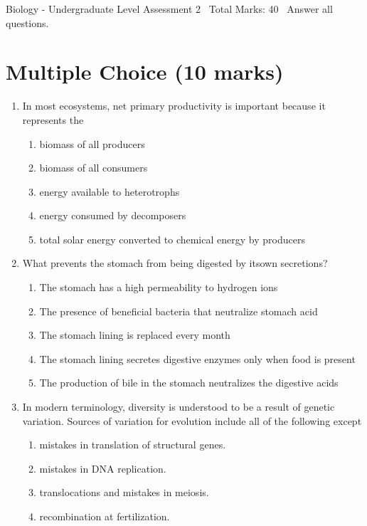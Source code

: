 \documentclass[12pt]{article}
\begin{document}
\begin{center}
Biology - Undergraduate Level Assessment 2 \
Total Marks: 40 \
Answer all questions.
\end{center}

\section*{Multiple Choice (10 marks)}
\begin{enumerate}[label=\arabic*.]
\item In most ecosystems, net primary productivity is important because it represents the
\begin{enumerate}[label=(\alph*)]
    \item biomass of all producers
    \item biomass of all consumers
    \item energy available to heterotrophs
    \item energy consumed by decomposers
    \item total solar energy converted to chemical energy by producers
\end{enumerate}
\item What prevents the stomach from being digested by itsown secretions?
\begin{enumerate}[label=(\alph*)]
    \item The stomach has a high permeability to hydrogen ions
    \item The presence of beneficial bacteria that neutralize stomach acid
    \item The stomach lining is replaced every month
    \item The stomach lining secretes digestive enzymes only when food is present
    \item The production of bile in the stomach neutralizes the digestive acids
\end{enumerate}
\item In modern terminology, diversity is understood to be a result of genetic variation. Sources of variation for evolution include all of the following except
\begin{enumerate}[label=(\alph*)]
    \item mistakes in translation of structural genes.
    \item mistakes in DNA replication.
    \item translocations and mistakes in meiosis.
    \item recombination at fertilization.

\end{enumerate}
\end{enumerate}
\end{document}
